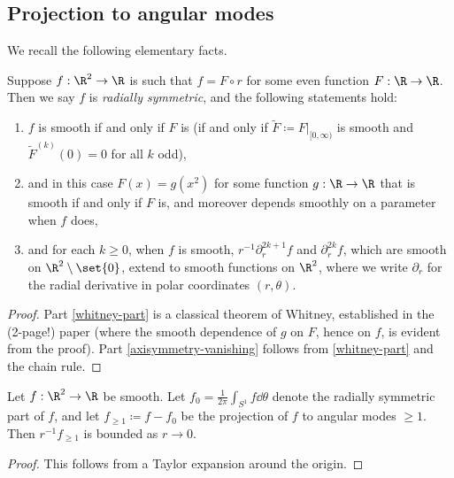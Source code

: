 \documentclass[10pt, reqno]{amsart}
\begin{document}
\subsection{Projection to angular modes}
We recall the following elementary facts.
\begin{lemma}
Suppose \(f:\R^2\to \R\) is such that \(f = F\circ r\) for some even function \(F : \R\to
\R\). Then we say \(f\) is \emph{radially symmetric}, and the following statements hold:
\begin{enumerate}
\item \label{even-smooth} \(f\) is smooth if and only if \(F\) is (if and only if \(\tilde{F}\coloneqq{}F|_{[0,\infty)}\) is
smooth and \(\tilde{F}^{(k)}(0) = 0\) for all \(k\) odd),
\item \label{whitney-part} and in this case \(F(x) = g(x^2)\) for some function \(g :
   \R\to \R\) that is smooth if and only if \(F\) is, and moreover depends smoothly
on a parameter when \(f\) does,
\item \label{axisymmetry-vanishing} and for each \(k\ge 0\), when \(f\) is smooth, \(r^{-1}\partial_r^{2k +
   1}f\) and \(\partial_r^{2k}f\), which are smooth on \(\R^2\setminus
   \set{0}\), extend to smooth functions on \(\R^2\), where we write \(\partial_r\) for
the radial derivative in polar coordinates \((r,\theta{})\).
\end{enumerate}
\label{axisymmetric-smoothness}
\end{lemma}
\begin{proof}
Part \cref{whitney-part} is a classical theorem of Whitney, established in the
(2-page!) paper \cite{whitney-even-functions} (where the smooth dependence of
\(g\) on \(F\), hence on \(f\), is evident from the proof). Part
\cref{axisymmetry-vanishing} follows from \cref{whitney-part} and the chain rule.
\end{proof}
\begin{lemma}
Let \(f : \R^2\to \R\) be smooth. Let \(f_0 = \frac{1}{2\pi{}}\int _{S^1}f\dd{}\theta{}\) denote the
radially symmetric part of \(f\), and let \(f_{\ge 1} \coloneqq{}f-f_0\) be the projection of
\(f\) to angular modes \(\ge 1\). Then \(r^{-1}f_{\ge 1}\) is bounded as \(r\to 0\).
\label{higher-modes-origin}
\end{lemma}
\begin{proof}
This follows from a Taylor expansion around the origin.
\end{proof}
\end{document}
